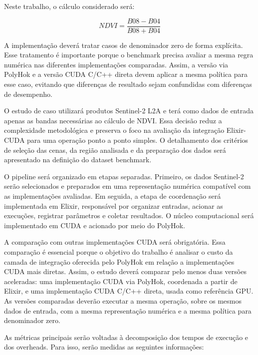 \documentclass[tcc,capa]{texufpel}
\begin{document}
Neste trabalho, o cálculo considerado será:

\[
NDVI = \frac{B08 - B04}{B08 + B04}
\]

A implementação deverá tratar casos de denominador zero de forma explícita. Esse tratamento é importante porque o benchmark precisa avaliar a mesma regra numérica nas diferentes implementações comparadas. Assim, a versão via PolyHok e a versão CUDA C/C++ direta devem aplicar a mesma política para esse caso, evitando que diferenças de resultado sejam confundidas com diferenças de desempenho.

O estudo de caso utilizará produtos Sentinel-2 L2A e terá como dados de entrada apenas as bandas necessárias ao cálculo de NDVI. Essa decisão reduz a complexidade metodológica e preserva o foco na avaliação da integração Elixir-CUDA para uma operação ponto a ponto simples. O detalhamento dos critérios de seleção das cenas, da região analisada e da preparação dos dados será apresentado na definição do dataset benchmark.

O pipeline será organizado em etapas separadas. Primeiro, os dados Sentinel-2 serão selecionados e preparados em uma representação numérica compatível com as implementações avaliadas. Em seguida, a etapa de coordenação será implementada em Elixir, responsável por organizar entradas, acionar as execuções, registrar parâmetros e coletar resultados. O núcleo computacional será implementado em CUDA e acionado por meio do PolyHok.

A comparação com outras implementações CUDA será obrigatória. Essa comparação é essencial porque o objetivo do trabalho é analisar o custo da camada de integração oferecida pelo PolyHok em relação a implementações CUDA mais diretas. Assim, o estudo deverá comparar pelo menos duas versões aceleradas: uma implementação CUDA via PolyHok, coordenada a partir de Elixir, e uma implementação CUDA C/C++ direta, usada como referência GPU. As versões comparadas deverão executar a mesma operação, sobre os mesmos dados de entrada, com a mesma representação numérica e a mesma política para denominador zero.

As métricas principais serão voltadas à decomposição dos tempos de execução e dos overheads. Para isso, serão medidas as seguintes informações:
\end{document}

